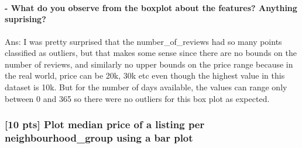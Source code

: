 \documentclass[11pt]{article}
\begin{document}
    \begin{center}
    \end{center}
    { \hspace*{\fill} \\}
    
    \begin{Verbatim}[commandchars=\\\{\}]

    \end{Verbatim}

    \begin{center}
    \end{center}
    { \hspace*{\fill} \\}
    
    \begin{Verbatim}[commandchars=\\\{\}]

    \end{Verbatim}

    \hypertarget{what-do-you-observe-from-the-boxplot-about-the-features-anything-suprising}{%
\paragraph{- What do you observe from the boxplot about the features?
Anything
suprising?}\label{what-do-you-observe-from-the-boxplot-about-the-features-anything-suprising}}

    Ans: I was pretty surprised that the number\_of\_reviews had so many
points classified as outliers, but that makes some sense since there are
no bounds on the number of reviews, and similarly no upper bounds on the
price range because in the real world, price can be 20k, 30k etc even
though the highest value in this dataset is 10k. But for the number of
days available, the values can range only between 0 and 365 so there
were no outliers for this box plot as expected.

    \hypertarget{pts-plot-median-price-of-a-listing-per-neighbourhood_group-using-a-bar-plot}{%
\subsubsection{{[}10 pts{]} Plot median price of a listing per
neighbourhood\_group using a bar
plot}\label{pts-plot-median-price-of-a-listing-per-neighbourhood_group-using-a-bar-plot}}
\end{document}
